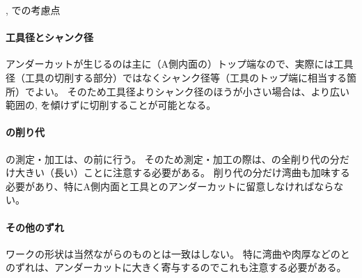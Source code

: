 \begin{\Columnname}{\BfaceDimpleMilling, \DfaceDimpleMilling での考慮点}
\paragraph*{工具径とシャンク径}
アンダーカットが生じるのは主に（A側内面の）トップ端なので、実際には工具径（工具の切削する部分）ではなくシャンク径等（工具のトップ端に相当する箇所）でよい。
そのため工具径よりシャンク径のほうが小さい場合は、より広い範囲の\BfaceDimpleMilling, \DfaceDimpleMilling を傾けずに切削することが可能となる。
\tcbline*
\paragraph*{\nameEndFacecut の削り代}
\Dimple の測定・加工は、\TopEndFacecutMilling の前に行う。
そのため測定・加工の際は、\nameEndFacecut の全削り代の分だけ大きい（長い）ことに注意する必要がある。
削り代の分だけ湾曲も加味する必要があり、特にA側内面と工具とのアンダーカットに留意しなければならない。
\tcbline*
\paragraph*{その他のずれ}
ワークの形状は当然ながら\nameDrawing のものとは一致はしない。
特に湾曲や肉厚などの\Drawing とのずれは、アンダーカットに大きく寄与するのでこれも注意する必要がある。
\end{\Columnname}



